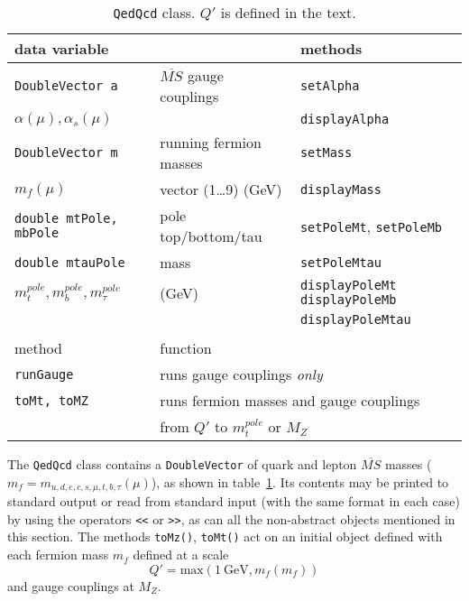 \documentclass[]{article}
\def\code#1{\small{\tt #1}\normalsize}
\def\gev{~\mbox{GeV}}
\begin{document}
\begin{table}\begin{center}\begin{tabular}{lll} 
data variable & & methods \\ \hline
\code{DoubleVector a} & $\overline{MS}$ gauge couplings & \code{setAlpha} \\
$\alpha(\mu),\alpha_s(\mu)$& &  \code{displayAlpha} \\ \hline
\code{DoubleVector m} & running fermion masses & \code{setMass}
\\ 
$m_f(\mu)$& vector (1\ldots 9) (GeV)&  \code{displayMass} \\ \hline
\code{double mtPole, mbPole} & pole top/bottom/tau & \code{setPoleMt},
\code{setPoleMb} \\
\code{double mtauPole} & mass & \code{setPoleMtau} \\
$m_t^{pole}, m_b^{pole}, m_\tau^{pole}$&(GeV) &  \code{displayPoleMt} \code{displayPoleMb}
\\
 & & \code{displayPoleMtau} \\
%
 &  & \\
method & \multicolumn{2}{l}{function} \\ \hline
\code{runGauge} & \multicolumn{2}{l}{runs gauge couplings {\em only}}\\
\code{toMt, toMZ} & \multicolumn{2}{l}{runs fermion masses and gauge couplings
} \\
 & \multicolumn{2}{l}{from $Q'$ to $m_t^{pole}$ or $M_Z$}\\
\end{tabular}\caption{\label{tab:qedqcd}\code{QedQcd} class. $Q'$ is defined in the text.}\end{center}\end{table}
The \code{QedQcd} class contains a \code{DoubleVector} of quark and lepton 
$\overline{MS}$ masses
($m_f=m_{u,d,e,c,s,\mu,t,b,\tau}(\mu)$), as shown in table~\ref{tab:qedqcd}.
Its contents may be printed to standard output or read from standard input
(with the same format in each 
case) by using the operators
\code{<<} or \code{>>}, as can all the non-abstract objects mentioned in this
section. The methods \code{toMz()}, \code{toMt()} act on an
initial object defined with each fermion mass $m_f$ defined at a scale
\begin{equation}
Q' = \mbox{max} (1 \gev, m_f(m_f)) \label{scaley}
\end{equation}
and gauge couplings at $M_Z$. 
\end{document}
